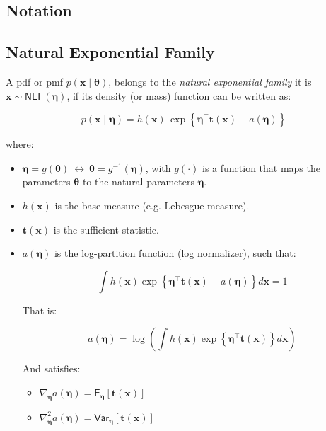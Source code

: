 \begin{appendix}
\chapter{Notation}
\label{Appendix_A}

\section{ Natural Exponential Family}

\cite{ML_MURPHY} A pdf or pmf $p(\bm{x} \mid \bm{\theta})$,  belongs to the \emph{natural exponential family} it is $\bm{x}\sim \mathsf{NEF}(\bm{\eta})$, if its density (or mass) function can be written as:

\begin{equation}
\label{NEF}
p(\bm{x} \mid \bm{\eta}) = h(\bm{x})\, \exp\left\{ \bm{\eta}^\top \bm{t}(\bm{x}) - a(\bm{\eta}) \right\} 
\end{equation}

where:

\begin{itemize}
\item $\bm{\eta} = g(\bm{\theta})  \ \leftrightarrow \ \bm{\theta} = g^{-1}(\bm{\eta})$, with $g(\cdot)$ is a function that maps the parameters $\bm{\theta}$ to the natural parameters $\bm{\eta}$.
\item $h(\bm{x})$ is the base measure (e.g. Lebesgue measure).
\item $\bm{t}(\bm{x})$ is the sufficient statistic.
\item $a(\bm{\eta})$ is the log-partition function (log normalizer), such that:

$$
\int h(\bm{x}) \exp\left\{ \bm{\eta}^\top \bm{t}(\bm{x}) - a(\bm{\eta}) \right\} d\bm{x} = 1
$$

That is:

\begin{equation}
a(\bm{\eta}) = \log\left( \int h(\bm{x}) \exp\left\{ \bm{\eta}^\top \bm{t}(\bm{x}) \right\} d\bm{x} \right)
\end{equation}

And satisfies:

\begin{itemize}
\item[a)] $\nabla_{\bm{\eta}} a(\bm{\eta}) = \mathsf{E}_{\bm{\eta}}\left[\bm{t}(\bm{x})\right]$
\item[b)] $\nabla_{\bm{\eta}}^2 a(\bm{\eta}) = \mathsf{Var}_{\bm{\eta}}\left[\bm{t}(\bm{x})\right]$
\end{itemize}
\end{itemize}


\end{appendix}
